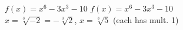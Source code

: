 {$f(x) = x^6-3x^3-10$}
{$f(x) = x^6-3x^3-10$ \\ $x = \sqrt[3]{-2} = -\sqrt[3]{2}$, $x = \sqrt[3]{5}$ (each has mult. 1)}